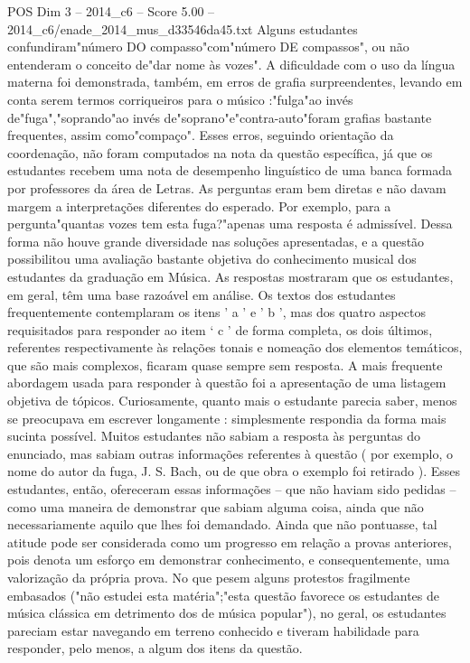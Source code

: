 \begin{textsample}{POS Dim 3 – 2014\_c6 – Score 5.00 – 2014\_c6/enade\_2014\_mus\_d33546da45.txt}
Alguns estudantes confundiram"número DO compasso"com"número DE compassos", ou não entenderam o conceito de"dar nome às vozes".
A dificuldade com o uso da língua materna foi demonstrada, também, em erros de grafia surpreendentes, levando em conta serem termos corriqueiros para o músico :"fulga"ao invés de"fuga","soprando"ao invés de"soprano"e"contra-auto"foram grafias bastante frequentes, assim como"compaço".
Esses erros, seguindo orientação da coordenação, não foram computados na nota da questão específica, já que os estudantes recebem uma nota de desempenho linguístico de uma banca formada por professores da área de Letras.
As perguntas eram bem diretas e não davam margem a interpretações diferentes do esperado.
Por exemplo, para a pergunta"quantas vozes tem esta fuga?"apenas uma resposta é admissível.
Dessa forma não houve grande diversidade nas soluções apresentadas, e a questão possibilitou uma avaliação bastante objetiva do conhecimento musical dos estudantes da graduação em Música.
As respostas mostraram que os estudantes, em geral, têm uma base razoável em análise.
Os textos dos estudantes frequentemente contemplaram os itens ’ a ' e ' b ', mas dos quatro aspectos requisitados para responder ao item ‘ c ' de forma completa, os dois últimos, referentes respectivamente às relações tonais e nomeação dos elementos temáticos, que são mais complexos, ficaram quase sempre sem resposta.
A mais frequente abordagem usada para responder à questão foi a apresentação de uma listagem objetiva de tópicos.
Curiosamente, quanto mais o estudante parecia saber, menos se preocupava em escrever longamente : simplesmente respondia da forma mais sucinta possível.
Muitos estudantes não sabiam a resposta às perguntas do enunciado, mas sabiam outras informações referentes à questão ( por exemplo, o nome do autor da fuga, J.
S.
Bach, ou de que obra o exemplo foi retirado ).
Esses estudantes, então, ofereceram essas informações – que não haviam sido pedidas – como uma maneira de demonstrar que sabiam alguma coisa, ainda que não necessariamente aquilo que lhes foi demandado.
Ainda que não pontuasse, tal atitude pode ser considerada como um progresso em relação a provas anteriores, pois denota um esforço em demonstrar conhecimento, e consequentemente, uma valorização da própria prova.
No que pesem alguns protestos fragilmente embasados ("não estudei esta matéria";"esta questão favorece os estudantes de música clássica em detrimento dos de música popular"), no geral, os estudantes pareciam estar navegando em terreno conhecido e tiveram habilidade para responder, pelo menos, a algum dos itens da questão.

\end{textsample}
